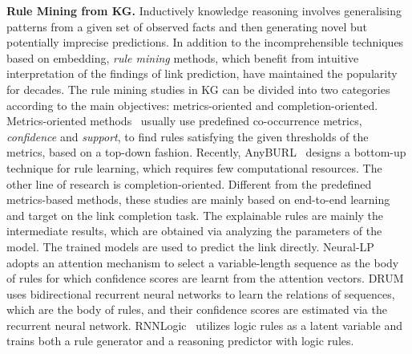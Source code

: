 \noindent
\textbf{Rule Mining from KG.}
Inductively knowledge reasoning involves generalising patterns from a given set of observed facts and then generating novel but potentially imprecise predictions.
In addition to the incomprehensible techniques based on embedding, \textit{rule mining} methods, which benefit from intuitive interpretation of the findings of link prediction, have maintained the popularity for decades.
The rule mining studies in KG can be divided into two categories according to the main objectives: metrics-oriented and completion-oriented.
Metrics-oriented methods~\cite{galarraga2013amie,galarraga2015fast,omran2019embedding}
usually use predefined co-occurrence metrics, \textit{confidence} and \textit{support}, to find rules satisfying the given thresholds of the metrics, based on a top-down fashion.
Recently,  AnyBURL~\cite{meilicke2019anytime} designs a bottom-up technique for rule learning, which requires few computational resources.
The other line of research is completion-oriented.
Different from the predefined metrics-based methods, these studies are mainly based on end-to-end learning and target on the link completion task.
The explainable rules are mainly the intermediate results, which are obtained via analyzing the parameters of the model.
The trained models are used to predict the link directly.
Neural-LP~\cite{yang2017differentiable} adopts an attention mechanism to select a variable-length sequence as the body of rules for which confidence scores are learnt from the attention vectors.
DRUM~\cite{sadeghian2019drum} uses bidirectional recurrent neural networks to learn the relations of sequences, which are the body of rules, and their confidence scores are estimated via the recurrent neural network.
RNNLogic~\cite{qu2020rnnlogic} utilizes logic rules as a latent variable and trains both a rule generator and a reasoning predictor with logic rules.

